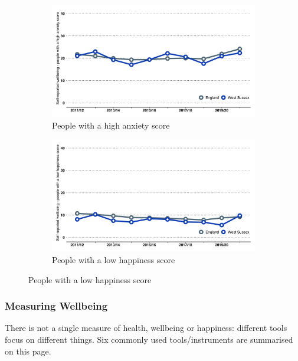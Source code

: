\begin{figure}
\begin{subfigure}[b]{0.48\textwidth}
    \end{subfigure}
    \vspace*{3mm}
    \begin{subfigure}[t]{0.48\textwidth}
        \centering
        \caption{People with a high anxiety score}\label{fig:wellb-surv:hanx}
        \includegraphics[width=\textwidth]{images/high_anxiety_line.png}
    \end{subfigure}
    \begin{subfigure}[t]{0.48\textwidth}
        \centering
        \caption{People with a low happiness score}\label{fig:wellb-surv:lhap}
        \includegraphics[width=\textwidth]{images/low_happiness_line.png}
    \end{subfigure}
\end{figure}

\clearpage

\subsubsection{Measuring Wellbeing}
There is not a single measure of health, wellbeing or happiness: different tools focus on different things. Six commonly used tools/instruments are summarised on this page.

